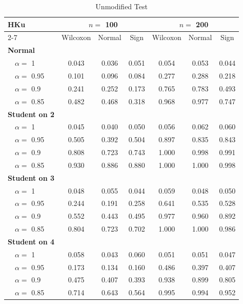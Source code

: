 %
\begin{table}[hptb]
\begin{center}
\begin{tabular}{|l||c|c|c||c|c|c|} \hline
\multicolumn{1}{|l||}{\bf HKu}&\multicolumn{3}{c||}{\bf $n =$ 100}&\multicolumn{3}{c|}{\bf $n =$ 200}\\ \cline{2-7}
\multicolumn{1}{|l||}{}&\multicolumn{1}{c|}{Wilcoxon}&\multicolumn{1}{c|}{Normal}&\multicolumn{1}{c||}{Sign}&\multicolumn{1}{c|}{Wilcoxon}&\multicolumn{1}{c|}{Normal}&\multicolumn{1}{c|}{Sign}\\ \hline
{\bf Normal}&&&&&&\\
~~$\alpha =$ 1&0.043&0.036&0.051&0.054&0.053&0.044\\ 
~~$\alpha =$ 0.95&0.101&0.096&0.084&0.277&0.288&0.218\\ 
~~$\alpha =$ 0.9&0.241&0.252&0.173&0.765&0.783&0.493\\ 
~~$\alpha =$ 0.85&0.482&0.468&0.318&0.968&0.977&0.747\\ \hline
{\bf Student on 2}&&&&&&\\
~~$\alpha =$ 1&0.045&0.040&0.050&0.056&0.062&0.060\\ 
~~$\alpha =$ 0.95&0.505&0.392&0.504&0.897&0.835&0.843\\ 
~~$\alpha =$ 0.9&0.808&0.723&0.743&1.000&0.998&0.991\\ 
~~$\alpha =$ 0.85&0.930&0.886&0.880&1.000&1.000&0.998\\ \hline
{\bf Student on 3}&&&&&&\\
~~$\alpha =$ 1&0.048&0.055&0.044&0.059&0.048&0.050\\ 
~~$\alpha =$ 0.95&0.244&0.191&0.258&0.641&0.535&0.528\\ 
~~$\alpha =$ 0.9&0.552&0.443&0.495&0.977&0.960&0.892\\ 
~~$\alpha =$ 0.85&0.804&0.723&0.702&1.000&1.000&0.986\\ \hline
{\bf Student on 4}&&&&&&\\
~~$\alpha =$ 1&0.058&0.043&0.060&0.051&0.051&0.047\\ 
~~$\alpha =$ 0.95&0.173&0.134&0.160&0.486&0.397&0.407\\ 
~~$\alpha =$ 0.9&0.475&0.407&0.393&0.938&0.899&0.805\\ 
~~$\alpha =$ 0.85&0.714&0.643&0.564&0.995&0.994&0.952\\ 
\hline
\end{tabular}
\vspace{3mm}
\caption{Unmodified Test\label{HKu}} 
\end{center}
\end{table}
